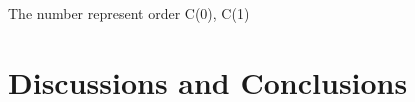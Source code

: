 \documentclass{article}
\begin{document}

The number represent order
C(0), C(1)




\section{Discussions and Conclusions} \label{sec:experiments}








\end{document}

